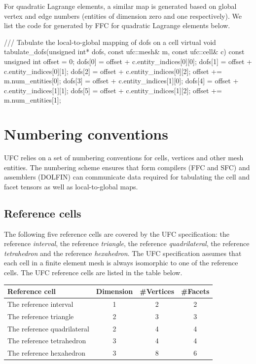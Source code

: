 For quadratic Lagrange elements, a similar map is generated based on
global vertex and edge numbers (entities of dimension zero and one
respectively). We list the code for  generated by
FFC for quadratic Lagrange elements below.
\begin{c++}
/// Tabulate the local-to-global mapping of dofs on a cell
virtual void tabulate_dofs(unsigned int* dofs,
                           const ufc::mesh& m,
                           const ufc::cell& c) const
{
  unsigned int offset = 0;
  dofs[0] = offset + c.entity_indices[0][0];
  dofs[1] = offset + c.entity_indices[0][1];
  dofs[2] = offset + c.entity_indices[0][2];
  offset += m.num_entities[0];
  dofs[3] = offset + c.entity_indices[1][0];
  dofs[4] = offset + c.entity_indices[1][1];
  dofs[5] = offset + c.entity_indices[1][2];
  offset += m.num_entities[1];
}
\end{c++}

\section{Numbering conventions}
\label{sec:alnes-2:numbering}

UFC relies on a set of numbering conventions for cells, vertices and
other mesh entities. The numbering scheme ensures that form compilers
(FFC and SFC) and assemblers (DOLFIN) can communicate data required
for tabulating the cell and facet tensors as well as local-to-global
maps.

\subsection{Reference cells}

The following five reference cells are covered by the UFC
specification: the reference \emph{interval}, the reference
\emph{triangle}, the reference \emph{quadrilateral}, the reference
\emph{tetrahedron} and the reference \emph{hexahedron}.  The UFC
specification assumes that each cell in a finite element mesh is
always isomorphic to one of the reference cells. The UFC reference
cells are listed in the table below.

\vspace{0.5cm}
\begin{center}
  \begin{tabular}{lccc}
    \toprule
    Reference cell & Dimension & \#Vertices & \#Facets \\
    \hline
    The reference interval      & 1 & 2 & 2 \\
    The reference triangle      & 2 & 3 & 3 \\
    The reference quadrilateral & 2 & 4 & 4 \\
    The reference tetrahedron   & 3 & 4 & 4 \\
    The reference hexahedron    & 3 & 8 & 6 \\
    \bottomrule
  \end{tabular}
\end{center}

